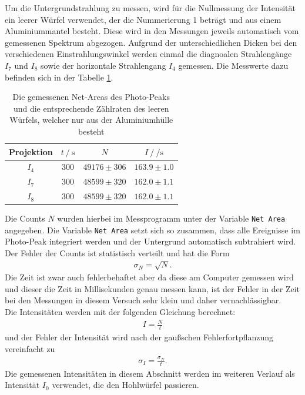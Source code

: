 Um die Untergrundstrahlung zu messen, wird für die Nullmessung der Intensität ein leerer Würfel verwendet, der die Nummerierung 1 beträgt und aus einem Aluminiummantel besteht. Diese wird in den Messungen jeweils automatisch vom gemessenen Spektrum abgezogen. 
Aufgrund der unterschiedlichen Dicken bei den verschiedenen Einstrahlungswinkel werden einmal die diagnoalen Strahlengänge $I_7$ und $I_8$ sowie der horizontale Strahlengang $I_4$ 
gemessen. Die Messwerte dazu befinden sich in der Tabelle \ref{tab:w1}.
\begin{table}[H]
  \centering
  \begin{tabular}{c c c c}
    \toprule
     Projektion &  $t \:/\: \si{\second}$ &                   $N$ &           $I \:/\: \si{\per\second}$ \\
    \midrule
              $I_{4}$ &   $300$ & $49176\pm 306$ & $163.9\pm 1.0$ \\
              $I_{7}$ &   $300$ & $48599\pm 320$ & $162.0\pm 1.1$ \\
              $I_{8}$ &   $300$ & $48599\pm 320$ & $162.0\pm 1.1$ \\
    \bottomrule
  \end{tabular}
  \caption{Die gemessenen Net-Areas des Photo-Peaks und die entsprechende Zählraten des leeren Würfels, welcher nur aus der Aluminiumhülle besteht}
  \label{tab:w1}
\end{table}

Die Counts $N$ wurden hierbei im Messprogramm unter der Variable \texttt{Net Area} angegeben. Die Variable \texttt{Net Area} setzt sich so zusammen, dass alle Ereignisse im Photo-Peak integriert werden und der Untergrund automatisch subtrahiert wird. 
Der Fehler der Counts ist statistisch verteilt und hat die Form 
\begin{align*}
  \sigma_N = \sqrt{N}.
\end{align*}
Die Zeit ist zwar auch fehlerbehaftet aber da diese am Computer gemessen wird und dieser die Zeit in Millisekunden genau messen kann, ist der Fehler in der Zeit bei den Messungen in diesem Versuch sehr klein und daher vernachlässigbar. \\
Die Intensitäten werden mit der folgenden Gleichung berechnet: \begin{align*}
  I = \frac{N}{t}
\end{align*}
und der Fehler der Intensität wird nach der gaußschen Fehlerfortpflanzung vereinfacht zu 
\begin{align*}
  \sigma_I = \frac{\sigma_N}{t}.
\end{align*}
Die gemessenen Intensitäten in diesem Abschnitt werden im weiteren Verlauf als Intensität $I_0$ verwendet, die den Hohlwürfel passieren. 


